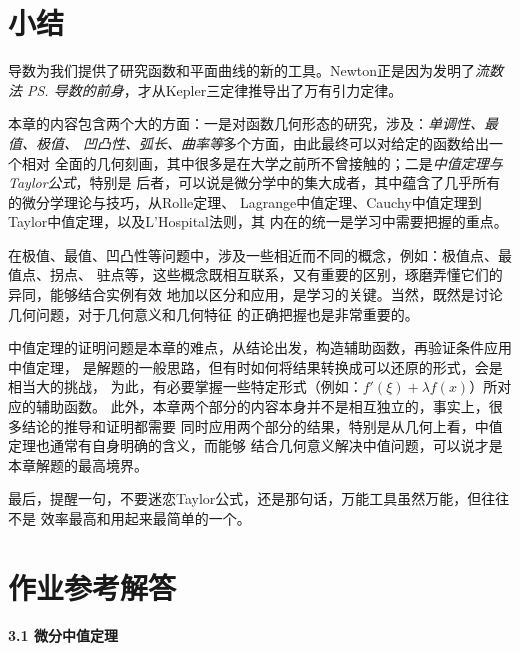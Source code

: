 \section{小结}

导数为我们提供了研究函数和平面曲线的新的工具。Newton正是因为发明了{\it 流数法
\ps{导数的前身}}，才从Kepler三定律推导出了万有引力定律。

本章的内容包含两个大的方面：一是对函数几何形态的研究，涉及：{\it 单调性、最值、极值、
凹凸性、弧长、曲率等}多个方面，由此最终可以对给定的函数给出一个相对
全面的几何刻画，其中很多是在大学之前所不曾接触的；二是{\it 中值定理与Taylor公式}，特别是
后者，可以说是微分学中的集大成者，其中蕴含了几乎所有的微分学理论与技巧，从Rolle定理、
Lagrange中值定理、Cauchy中值定理到Taylor中值定理，以及L'Hospital法则，其
内在的统一是学习中需要把握的重点。

在极值、最值、凹凸性等问题中，涉及一些相近而不同的概念，例如：极值点、最值点、拐点、
驻点等，这些概念既相互联系，又有重要的区别，琢磨弄懂它们的异同，能够结合实例有效
地加以区分和应用，是学习的关键。当然，既然是讨论几何问题，对于几何意义和几何特征
的正确把握也是非常重要的。

中值定理的证明问题是本章的难点，从结论出发，构造辅助函数，再验证条件应用中值定理，
是解题的一般思路，但有时如何将结果转换成可以还原的形式，会是相当大的挑战，
为此，有必要掌握一些特定形式（例如：$f'(\xi)+\lambda f(x)$）所对应的辅助函数。
此外，本章两个部分的内容本身并不是相互独立的，事实上，很多结论的推导和证明都需要
同时应用两个部分的结果，特别是从几何上看，中值定理也通常有自身明确的含义，而能够
结合几何意义解决中值问题，可以说才是本章解题的最高境界。

最后，提醒一句，不要迷恋Taylor公式，还是那句话，万能工具虽然万能，但往往不是
效率最高和用起来最简单的一个。

\ifvisible

\newpage

\section*{作业参考解答}

\begin{center}
	\bf 3.1 微分中值定理
\end{center}

\bigskip

